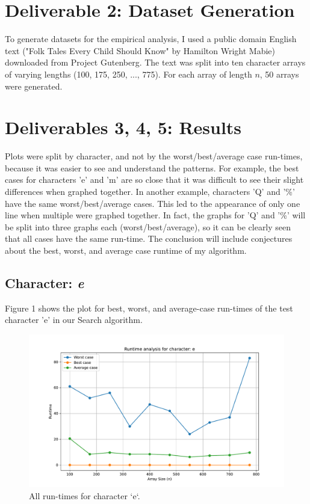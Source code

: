 \documentclass{article}
\begin{document}
\section{Deliverable 2: Dataset Generation}
To generate datasets for the empirical analysis, I used a public domain English text ("Folk Tales Every Child Should Know" by Hamilton Wright Mabie) downloaded from Project Gutenberg. The text was split into ten character arrays of varying lengths (100, 175, 250, ..., 775). For each array of length \( n \), 50 arrays were generated.

\section{Deliverables 3, 4, 5: Results}
Plots were split by character, and not by the worst/best/average case run-times, because it was easier to see and understand the patterns. For example, the best cases for characters 'e' and 'm' are so close that it was difficult to see their slight differences when graphed together. In another example, characters 'Q' and '\%' have the same worst/best/average cases. This led to the appearance of only one line when multiple were graphed together. In fact, the graphs for 'Q' and '\%' will be split into three graphs each (worst/best/average), so it can be clearly seen that all cases have the same run-time. The conclusion will include conjectures about the best, worst, and average case runtime of my algorithm.
	
\subsection{Character: \textit{e}}
Figure 1 shows the plot for best, worst, and average-case run-times of the test character 'e' in our Search algorithm.
    \begin{figure}[H]
	\centering
	\includegraphics[width=\textwidth]{runtime_analysis_e.pdf}
	\caption{All run-times for character `e`.}
    \end{figure}
\end{document}
